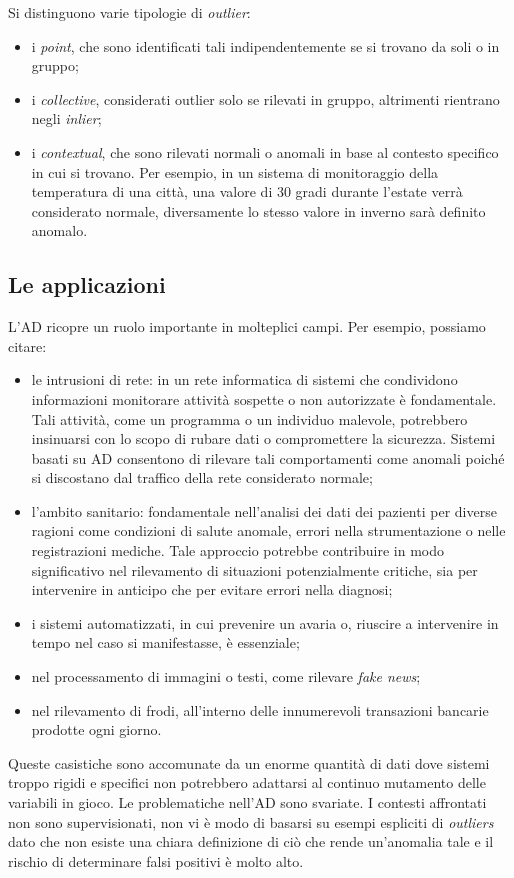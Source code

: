 Si distinguono varie tipologie di \textit{outlier}:
\begin{itemize}
	\item{i \textit{point}, che sono identificati tali indipendentemente se si trovano da soli o in gruppo;}
	\item{i \textit{collective}, considerati outlier solo se rilevati in gruppo, altrimenti rientrano negli \textit{inlier};}
	\item{i \textit{contextual}, che sono rilevati normali o anomali in base al contesto specifico in cui si
	trovano. Per esempio, in un sistema di monitoraggio della temperatura di una città,
	una valore di 30 gradi durante l’estate verrà considerato normale, diversamente lo
	stesso valore in inverno sarà definito anomalo.}
\end{itemize}

\subsection{Le applicazioni}
L’AD ricopre un ruolo importante in molteplici campi. Per esempio, possiamo citare:
\begin{itemize}
	\item{le intrusioni di rete: in un rete informatica di sistemi che condividono informazioni
	monitorare attività sospette o non autorizzate è fondamentale. Tali attività, come un
	programma o un individuo malevole, potrebbero insinuarsi con lo scopo di rubare dati
	o compromettere la sicurezza. Sistemi basati su AD consentono di rilevare tali
	comportamenti come anomali poiché si discostano dal traffico della rete considerato
	normale;}
	\item{l’ambito sanitario: fondamentale nell’analisi dei dati dei pazienti per diverse ragioni
	come condizioni di salute anomale, errori nella strumentazione o nelle registrazioni
	mediche. Tale approccio potrebbe contribuire in modo significativo nel rilevamento di
	situazioni potenzialmente critiche, sia per intervenire in anticipo che per evitare errori
	nella diagnosi;}
	\item{i sistemi automatizzati, in cui prevenire un avaria o, riuscire a intervenire in tempo nel
	caso si manifestasse, è essenziale;}
	\item{nel processamento di immagini o testi, come rilevare \textit{fake news};}
	\item{nel rilevamento di frodi, all’interno delle innumerevoli transazioni bancarie prodotte
	ogni giorno.}
\end{itemize}
Queste casistiche sono accomunate da un enorme quantità di dati dove sistemi troppo rigidi e
specifici non potrebbero adattarsi al continuo mutamento delle variabili in gioco. Le
problematiche nell’AD sono svariate. I contesti affrontati non sono supervisionati, non vi è
modo di basarsi su esempi espliciti di \textit{outliers} dato che non esiste una chiara definizione di
ciò che rende un'anomalia tale e il rischio di determinare falsi positivi è molto alto.

